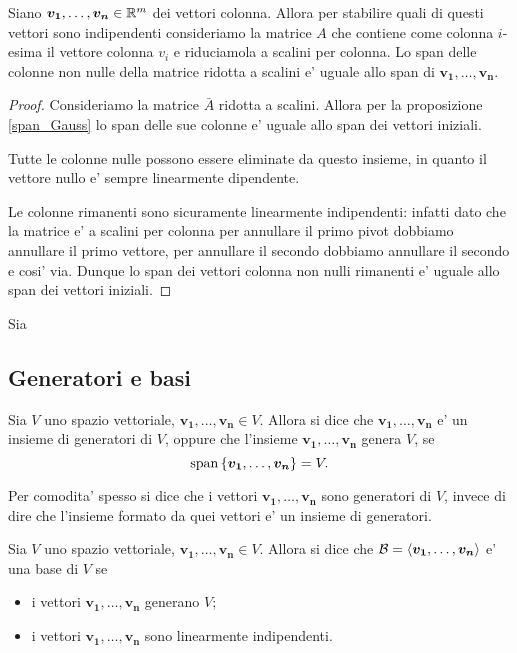 \begin{proposition} \label{span_colonne_indipendenti}
    Siano $\bm{v_1}, \dots, \bm{v_n} \in \mathbb{R}^m$ dei vettori colonna. Allora per stabilire quali di questi vettori sono indipendenti consideriamo la matrice $A$ che contiene come colonna $i$-esima il vettore colonna $v_i$ e riduciamola a scalini per colonna. Lo span delle colonne non nulle della matrice ridotta a scalini e' uguale allo span di $\bm{v_1}, \dots, \bm{v_n}$.
\end{proposition}
\begin{proof} 
    Consideriamo la matrice $\bar{A}$ ridotta a scalini. Allora per la proposizione \ref{span_Gauss} lo span delle sue colonne e' uguale allo span dei vettori iniziali. 

    Tutte le colonne nulle possono essere eliminate da questo insieme, in quanto il vettore nullo e' sempre linearmente dipendente.

    Le colonne rimanenti sono sicuramente linearmente indipendenti: infatti dato che la matrice e' a scalini per colonna per annullare il primo pivot dobbiamo annullare il primo vettore, per annullare il secondo dobbiamo annullare il secondo e cosi' via. Dunque lo span dei vettori colonna non nulli rimanenti e' uguale allo span dei vettori iniziali.
\end{proof}

\begin{example}
    Sia    
\end{example}

\subsection{Generatori e basi}
\begin{definition}
    Sia $V$ uno spazio vettoriale, $\bm{v_1}, \dots, \bm{v_n} \in V$. Allora si dice che ${\bm{v_1}, \dots, \bm{v_n}}$ e' un insieme di generatori di $V$, oppure che l'insieme ${\bm{v_1}, \dots, \bm{v_n}}$ genera $V$, se
    \begin{equation}
        \operatorname{span}\left\{\bm{v_1}, \dots, \bm{v_n}\right\} = V.
    \end{equation}
\end{definition}

Per comodita' spesso si dice che i vettori $\bm{v_1}, \dots, \bm{v_n}$ sono generatori di $V$, invece di dire che l'insieme formato da quei vettori e' un insieme di generatori.

\begin{definition}
    Sia $V$ uno spazio vettoriale, $\bm{v_1}, \dots, \bm{v_n} \in V$. Allora si dice che $\mathcal{B} = \left\langle \bm{v_1}, \dots, \bm{v_n} \right\rangle$ e' una base di $V$ se
    \begin{itemize}
        \item i vettori $\bm{v_1}, \dots, \bm{v_n}$ generano $V$;
        \item i vettori $\bm{v_1}, \dots, \bm{v_n}$ sono linearmente indipendenti.
    \end{itemize}
\end{definition}

